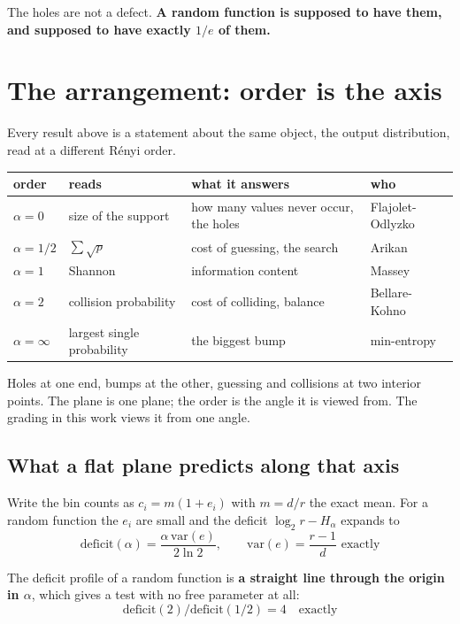The holes are not a defect. \textbf{A random function is supposed to have them, and supposed to have exactly \(1/e\) of them.}

\section{The arrangement: order is the axis}

Every result above is a statement about the same object, the output distribution, read at a different Rényi order.

\begin{center}
\begin{tabular}{@{}llll@{}}
\toprule
order & reads & what it answers & who \\
\midrule
\(\alpha = 0\) & size of the support & how many values never occur, the holes & Flajolet-Odlyzko \\
\(\alpha = 1/2\) & \(\sum\sqrt{p}\) & cost of guessing, the search & Arikan \\
\(\alpha = 1\) & Shannon & information content & Massey \\
\(\alpha = 2\) & collision probability & cost of colliding, balance & Bellare-Kohno \\
\(\alpha = \infty\) & largest single probability & the biggest bump & min-entropy \\
\bottomrule
\end{tabular}
\end{center}

Holes at one end, bumps at the other, guessing and collisions at two interior points. The plane is one plane; the order is the angle it is viewed from. The grading in this work views it from one angle.

\subsection{What a flat plane predicts along that axis}

Write the bin counts as \(c_i = m(1 + e_i)\) with \(m = d/r\) the exact mean. For a random function the \(e_i\) are small and the deficit \(\log_2 r - H_\alpha\) expands to
\[
\mathrm{deficit}(\alpha) = \frac{\alpha\,\mathrm{var}(e)}{2\ln 2}, \qquad \mathrm{var}(e) = \frac{r-1}{d} \text{ exactly}
\]

The deficit profile of a random function is \textbf{a straight line through the origin in \(\alpha\)}, which gives a test with no free parameter at all:
\[
\mathrm{deficit}(2) / \mathrm{deficit}(1/2) = 4 \quad\text{exactly}
\]

